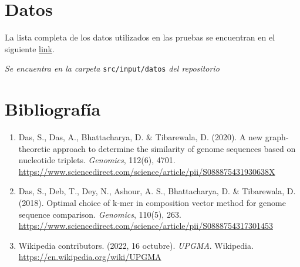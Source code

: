 \documentclass[12pt]{article}
\begin{document}
\section{Datos}

La lista completa de los datos utilizados en las pruebas se encuentran en el siguiente \href{https://gitlab.com/pppkizbroutle/proyecto-genomica/-/raw/master/src/input/datos.txt}{link}.

\begin{center}
  \textit{Se encuentra en la carpeta }\texttt{src/input/datos}\textit{ del repositorio}
\end{center}

\section{Bibliografía}

\begin{enumerate}
\item Das, S., Das, A., Bhattacharya, D. \& Tibarewala, D. (2020). A new graph-theoretic approach to determine the similarity of genome sequences based on nucleotide triplets. \textit{Genomics}, 112(6), 4701.\\ \href{https://www.sciencedirect.com/science/article/pii/S088875431930638X}{https://www.sciencedirect.com/science/article/pii/S088875431930638X}
\item Das, S., Deb, T., Dey, N., Ashour, A. S., Bhattacharya, D. \& Tibarewala, D. (2018). Optimal choice of k-mer in composition vector method for genome sequence comparison. \textit{Genomics}, 110(5), 263.\\ \href{https://www.sciencedirect.com/science/article/pii/S0888754317301453}{https://www.sciencedirect.com/science/article/pii/S0888754317301453}
\item Wikipedia contributors. (2022, 16 octubre). \textit{UPGMA}. Wikipedia.\\ \href{https://en.wikipedia.org/wiki/UPGMA}{https://en.wikipedia.org/wiki/UPGMA}
\end{enumerate}
\end{document}
